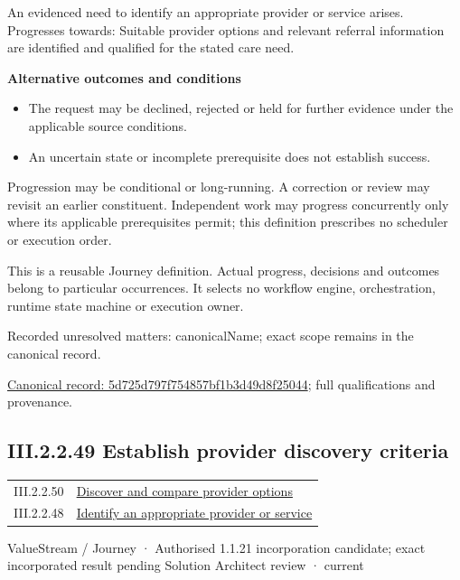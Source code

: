 An evidenced need to identify an appropriate provider or service arises. Progresses towards: Suitable provider options and relevant referral information are identified and qualified for the stated care need.



\par\medskip\textbf{Alternative outcomes and conditions}\par


\begin{itemize}


\item The request may be declined, rejected or held for further evidence under the applicable source conditions.

\item An uncertain state or incomplete prerequisite does not establish success.

\end{itemize}


Progression may be conditional or long-running. A correction or review may revisit an earlier constituent. Independent work may progress concurrently only where its applicable prerequisites permit; this definition prescribes no scheduler or execution order.



This is a reusable Journey definition. Actual progress, decisions and outcomes belong to particular occurrences. It selects no workflow engine, orchestration, runtime state machine or execution owner.


{\small Recorded unresolved matters: canonicalName; exact scope remains in the canonical record.}\par
{\footnotesize \href{../../../../../../../continuum/strategy/value-stream/5d725d797f754857bf1b3d49d8f25044.md}{Canonical record: 5d725d797f754857bf1b3d49d8f25044}; full qualifications and provenance.}\par
\subsection*{III.2.2.49 Establish provider discovery criteria}
\label{navigation:III.2.2.49}

\begin{longtable}{p{.22\linewidth}p{.73\linewidth}}
III.2.2.50 & \hyperref[element:13370b1e9a1349d8ba074e3ad5a8c1ae]{Discover and compare provider options} \\
III.2.2.48 & \hyperref[element:5d725d797f754857bf1b3d49d8f25044]{Identify an appropriate provider or service} \\
\end{longtable}
\label{element:4b20709f112540978fc6dafd6c85beed}
{\small ValueStream / Journey · Authorised 1.1.21 incorporation candidate; exact incorporated result pending Solution Architect review · current}\par

